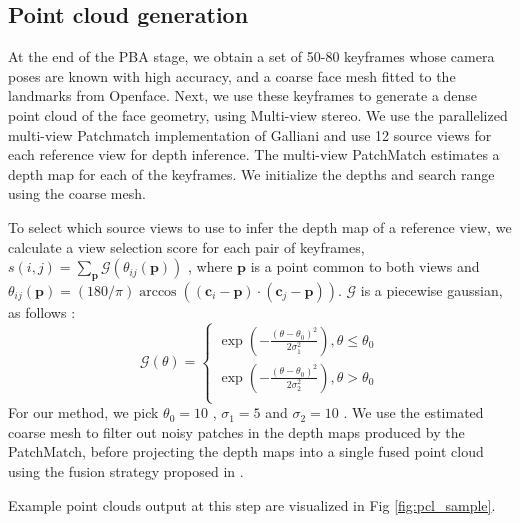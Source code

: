 \documentclass[10pt,twocolumn,letterpaper]{article}
\begin{document}
\subsection{Point cloud generation} \label{sec:pcl}

At the end of the PBA stage, we obtain a set of 50-80 keyframes whose camera poses are known with high accuracy, and a coarse face mesh fitted to the landmarks from Openface. Next, we use these keyframes to generate a dense point cloud of the face geometry, using Multi-view stereo.
 We use the parallelized multi-view Patchmatch implementation of Galliani \etal \cite{galliani2015massively} and use 12 source views for each reference view for depth inference. The multi-view PatchMatch estimates a depth map for each of the keyframes. We initialize the depths and search range using the coarse mesh.


To select which source views to use to infer the depth map of a reference view, we calculate a view selection score \cite{yao2018mvsnet} for each pair of keyframes, $s(i, j) = \sum_{\mathbf{p}} \mathcal{G}(\theta_{ij}(\mathbf{p}))$ , where $\mathbf{p}$ is a point common to both views and $\theta_{ij}(\mathbf{p}) = (180/\pi)\arccos((\mathbf{c}_i - \mathbf{p}) \cdot (\mathbf{c}_j - \mathbf{p}))$. $\mathcal{G}$ is a piecewise gaussian, as follows :
\[ \mathcal{G}(\theta) =  \left\{
\begin{array}{ll}
      \exp(-\frac{(\theta - \theta_0)^2}{2\sigma_1^2}), \theta \leq \theta_0 \\
      \exp(-\frac{(\theta - \theta_0)^2}{2\sigma_2^2}), \theta > \theta_0 \\
\end{array} 
\right. \]
For our method, we pick $\theta_{0} =10 $  , $\sigma_{1} =5$  and $\sigma_2=10$  .
 We use the estimated coarse mesh to filter out noisy patches in the depth maps produced by the PatchMatch, before projecting the depth maps into a single fused point cloud using the fusion strategy proposed in \cite{galliani2015massively}.

Example point clouds output at this step are visualized in Fig \ref{fig:pcl_sample}. 
\end{document}

